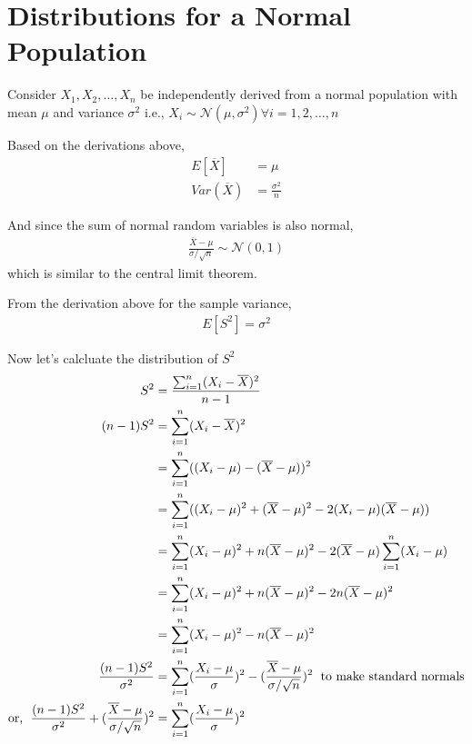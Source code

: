 \documentclass[../probability-notes.tex]{subfiles}
\begin{document}
    
    \section{Distributions for a Normal Population}\label{dist_for_normal}
    Consider $X_{1}, X_{2}, \ldots, X_{n}$ be independently derived from a normal population with mean $\mu$ and variance $\sigma^{2}$\newline
    i.e., $X_{i} \sim \mathcal{N}(\mu, \sigma^{2}) \forall i = 1, 2, \ldots, n$ \newline

    Based on the derivations above,
    \begin{align*}
        E[\overline{X}] &= \mu\\
        Var(\overline{X}) &= \frac{\sigma^{2}}{n}
    \end{align*}

    And since the sum of normal random variables is also normal,
    \begin{align*}
        \frac{\overline{X} - \mu}{\sigma/\sqrt{n}} \sim \mathcal{N}(0, 1)
    \end{align*}
    which is similar to the central limit theorem.\newline

    From the derivation above for the sample variance,
    \begin{align*}
        E[S^{2}] = \sigma^{2}
    \end{align*}

    Now let's calcluate the distribution of $S^{2}$
    \begin{align*}
        S^{2} &= \frac{\sum_{i=1}^{n} (X_{i} - \overline{X})^{2}}{n-1}\\
        (n-1)S^{2} &= \sum_{i=1}^{n} (X_{i} - \overline{X})^{2}\\
        &= \sum_{i=1}^{n} ((X_{i} - \mu) - (\overline{X} - \mu))^{2}\\
        &= \sum_{i=1}^{n} ((X_{i} - \mu)^{2} + (\overline{X} - \mu)^{2} - 2(X_{i} - \mu)(\overline{X} - \mu))\\
        &= \sum_{i=1}^{n} (X_{i} - \mu)^{2} + n(\overline{X} - \mu)^{2} - 2(\overline{X} - \mu)\sum_{i=1}^{n}(X_{i} - \mu)\\
        &= \sum_{i=1}^{n} (X_{i} - \mu)^{2} + n(\overline{X} - \mu)^{2} - 2n(\overline{X} - \mu)^{2}\\
        &= \sum_{i=1}^{n} (X_{i} - \mu)^{2} - n(\overline{X} - \mu)^{2}\\
        \frac{(n-1)S^{2}}{\sigma^{2}} &= \sum_{i=1}^{n} (\frac{X_{i} - \mu}{\sigma})^{2} - (\frac{\overline{X} - \mu}{\sigma/\sqrt{n}})^{2} \text{\; to make standard normals}\\
        \text{or, \;} \frac{(n-1)S^{2}}{\sigma^{2}} + (\frac{\overline{X} - \mu}{\sigma/\sqrt{n}})^{2} &= \sum_{i=1}^{n} (\frac{X_{i} - \mu}{\sigma})^{2}
    \end{align*}
\end{document}
